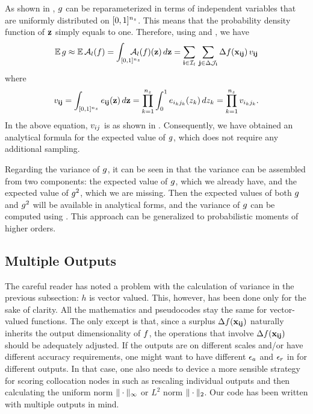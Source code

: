 As shown in , $g$ can be reparameterized in terms of
independent variables that are uniformly distributed on $[0, 1]^{n_z}$. This means
that the probability density function of $\mathbf{z}$ simply equals to one. Therefore,
using  and , we have
\[
  \mathbb{E} \, g \approx \mathbb{E} \, \mathcal{A}_{l}(f) = \int_{[0, 1]^{n_z}} \hspace{-1.5em} \mathcal{A}_{l}(f)(\mathbf{z}) \, d\mathbf{z} = \sum_{\mathbf{i} \in \mathcal{I}_l} \, \sum_{\mathbf{j} \in \Delta\mathcal{J}_{\mathbf{i}}} \Delta f(\mathbf{x}_{\mathbf{i}\mathbf{j}}) \, v_{\mathbf{i}\mathbf{j}}
\]
where
\[
  v_{\mathbf{i}\mathbf{j}} = \int_{[0, 1]^{n_z}} e_{\mathbf{i}\mathbf{j}}(\mathbf{z}) \, d\mathbf{z} = \prod_{k = 1}^{{n_z}} \int_0^1 e_{i_k j_k}(z_k) \, dz_k = \prod_{k = 1}^{{n_z}} v_{i_k j_k}.
\]
In the above equation, $v_{ij}$ is as shown in . Consequently, we
have obtained an analytical formula for the expected value of $g$, which does
not require any additional sampling.

Regarding the variance of $g$, it can be seen in  that the
variance can be assembled from two components: the expected value of $g$, which
we already have, and the expected value of $g^2$, which we are missing.
Then the expected values of both $g$ and $g^2$ will be available in analytical
forms, and the variance of $g$ can be computed using . This
approach can be generalized to probabilistic moments of higher orders.

\subsection{Multiple Outputs}
The careful reader has noted a problem with the calculation of variance in the
previous subsection: $h$ is vector valued.  This, however, has been done only
for the sake of clarity. All the mathematics and pseudocodes stay the same for
vector-valued functions. The only except is that, since a surplus
$\Delta f(\mathbf{x}_{\mathbf{i}\mathbf{j}})$ naturally inherits the output dimensionality of $f$,
the operations that involve $\Delta f(\mathbf{x}_{\mathbf{i}\mathbf{j}})$ should be adequately
adjusted. If the outputs are on different scales and/or have different accuracy
requirements, one might want to have different $\epsilon_a$ and $\epsilon_r$ in
 for different outputs. In that case, one also needs to
device a more sensible strategy for scoring collocation nodes in 
such as rescaling individual outputs and then calculating the uniform norm
$\| \cdot \|_\infty$ or $L^2$ norm $\| \cdot \|_2$. Our code \cite{sources}
has been written with multiple outputs in mind.

